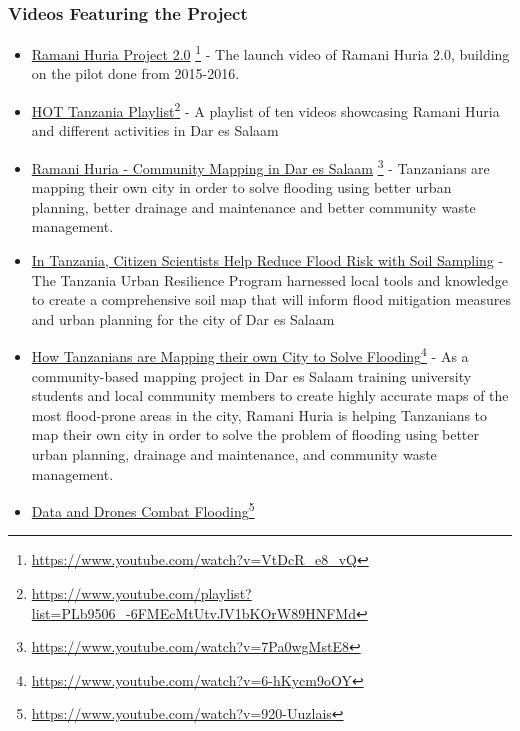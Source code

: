 \documentclass[a4paper,12pt,twoside]{article}
\begin{document}
\subsubsection{Videos Featuring the Project}
\bigskip
\begin{mdframed}[hidealllines=true,backgroundcolor=RHgreen!10,innerleftmargin=6pt,innerrightmargin=6pt,leftmargin=-3pt,rightmargin=-3pt]
\begin{itemize}
    \item \href{https://www.youtube.com/watch?v=VtDcR_e8_vQ}{Ramani Huria Project 2.0} \footnote{\url{https://www.youtube.com/watch?v=VtDcR_e8_vQ}}
- The launch video of Ramani Huria 2.0, building on the pilot done from 2015-2016.
    \item \href{https://www.youtube.com/playlist?list=PLb9506_-6FMEcMtUtvJV1bKOrW89HNFMd}{HOT Tanzania Playlist}\footnote{\url{https://www.youtube.com/playlist?list=PLb9506_-6FMEcMtUtvJV1bKOrW89HNFMd}}
- A playlist of ten videos showcasing Ramani Huria and different activities in Dar es Salaam
    \item \href{https://www.youtube.com/watch?v=7Pa0wgMstE8}{Ramani Huria - Community Mapping in Dar es Salaam} \footnote{\url{https://www.youtube.com/watch?v=7Pa0wgMstE8}} - Tanzanians are mapping their own city in order to solve flooding using better urban planning, better drainage and maintenance and better community waste management.
    \item \href{https://www.worldbank.org/en/news/video/2019/05/15/in-tanzania-citizen-scientists-help-reduce-flood-risk-with-soil-sampling}{In Tanzania, Citizen Scientists Help Reduce Flood Risk with Soil Sampling}
- The Tanzania Urban Resilience Program harnessed local tools and knowledge to create a comprehensive soil map that will inform flood mitigation measures and urban planning for the city of Dar es Salaam
    \item \href{https://www.youtube.com/watch?v=6-hKycm9oOY}{How Tanzanians are Mapping their own City to Solve Flooding}\footnote{\url{https://www.youtube.com/watch?v=6-hKycm9oOY}}
- As a community-based mapping project in Dar es Salaam training university students and local community members to create highly accurate maps of the most flood-prone areas in the city, Ramani Huria is helping Tanzanians to map their own city in order to solve the problem of flooding using better urban planning, drainage and maintenance, and community waste management.
    \item \href{https://www.youtube.com/watch?v=920-Uuzlais}{Data and Drones Combat Flooding}\footnote{\url{https://www.youtube.com/watch?v=920-Uuzlais}}

\end{itemize}
\end{mdframed}
\end{document}
